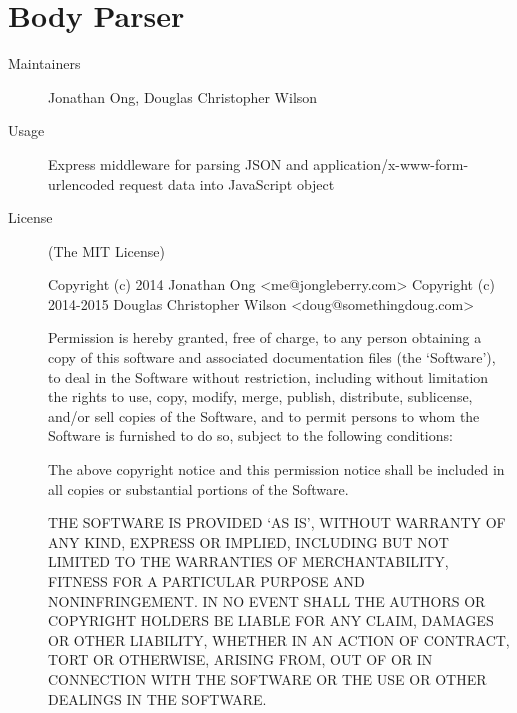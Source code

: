   \section*{Body Parser}
    \begin{description}
      \item[Maintainers] Jonathan Ong, Douglas Christopher Wilson 
      \item[Usage] Express middleware for parsing JSON and application/x-www-form-urlencoded request data into JavaScript object
      \item[License] \scriptsize (The MIT License)

        Copyright (c) 2014 Jonathan Ong <me@jongleberry.com>
        Copyright (c) 2014-2015 Douglas Christopher Wilson <doug@somethingdoug.com>

        Permission is hereby granted, free of charge, to any person obtaining
        a copy of this software and associated documentation files (the
        `Software'), to deal in the Software without restriction, including
        without limitation the rights to use, copy, modify, merge, publish,
        distribute, sublicense, and/or sell copies of the Software, and to
        permit persons to whom the Software is furnished to do so, subject to
        the following conditions:

        The above copyright notice and this permission notice shall be
        included in all copies or substantial portions of the Software.

        THE SOFTWARE IS PROVIDED `AS IS', WITHOUT WARRANTY OF ANY KIND,
        EXPRESS OR IMPLIED, INCLUDING BUT NOT LIMITED TO THE WARRANTIES OF
        MERCHANTABILITY, FITNESS FOR A PARTICULAR PURPOSE AND NONINFRINGEMENT.
        IN NO EVENT SHALL THE AUTHORS OR COPYRIGHT HOLDERS BE LIABLE FOR ANY
        CLAIM, DAMAGES OR OTHER LIABILITY, WHETHER IN AN ACTION OF CONTRACT,
        TORT OR OTHERWISE, ARISING FROM, OUT OF OR IN CONNECTION WITH THE
        SOFTWARE OR THE USE OR OTHER DEALINGS IN THE SOFTWARE.
    \end{description}

